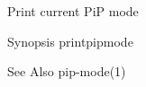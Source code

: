 Print current Pi\-P mode

\begin{DoxyParagraph}{Synopsis}
printpipmode
\end{DoxyParagraph}
\begin{DoxySeeAlso}{See Also}
pip-\/mode(1) 
\end{DoxySeeAlso}
